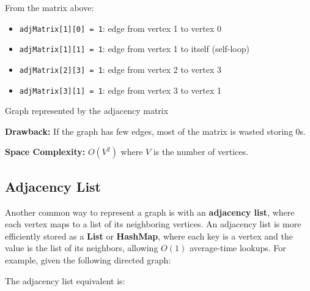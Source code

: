 From the matrix above:
\begin{itemize}
  \item \texttt{adjMatrix[1][0] = 1}: edge from vertex 1 to vertex 0
  \item \texttt{adjMatrix[1][1] = 1}: edge from vertex 1 to itself (self-loop)
  \item \texttt{adjMatrix[2][3] = 1}: edge from vertex 2 to vertex 3
  \item \texttt{adjMatrix[3][1] = 1}: edge from vertex 3 to vertex 1
\end{itemize}

\begin{center}

{\small Graph represented by the adjacency matrix}
\end{center}

\textbf{Drawback:} If the graph has few edges, most of the matrix is wasted storing 0s.

\textbf{Space Complexity:} $O(V^2)$ where $V$ is the number of vertices.

\subsection{Adjacency List}

Another common way to represent a graph is with an \textbf{adjacency list}, where each vertex maps to a list of its neighboring vertices. An adjacency list is more efficiently stored as a \textbf{List} or  \textbf{HashMap}, where each key is a vertex and the value is the list of its neighbors, allowing $O(1)$ average-time lookups. For example, given the following directed graph:

\begin{center}
\end{center}
The adjacency list equivalent is:

